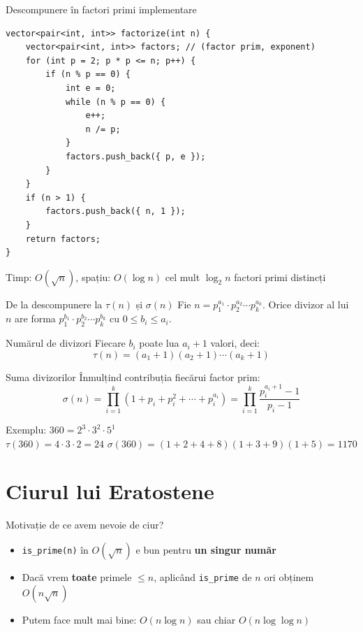\documentclass[10pt]{beamer}
\begin{document}
\begin{frame}[fragile]{Descompunere în factori primi \textemdash{} implementare}
  \begin{lstlisting}
vector<pair<int, int>> factorize(int n) {
    vector<pair<int, int>> factors; // (factor prim, exponent)
    for (int p = 2; p * p <= n; p++) {
        if (n % p == 0) {
            int e = 0;
            while (n % p == 0) {
                e++;
                n /= p;
            }
            factors.push_back({ p, e });
        }
    }
    if (n > 1) {
        factors.push_back({ n, 1 });
    }
    return factors;
}
  \end{lstlisting}
  Timp: $O(\sqrt{n})$, spațiu: $O(\log n)$ \textemdash{} cel mult $\log_2 n$ factori primi distincți
\end{frame}

\begin{frame}{De la descompunere la $\tau(n)$ și $\sigma(n)$}
  Fie $n = p_1^{a_1} \cdot p_2^{a_2} \cdots p_k^{a_k}$. Orice divizor al lui $n$ are forma
  $p_1^{b_1} \cdot p_2^{b_2} \cdots p_k^{b_k}$ cu $0 \leq b_i \leq a_i$.
  \begin{block}{Numărul de divizori}
    Fiecare $b_i$ poate lua $a_i + 1$ valori, deci:
    \[ \tau(n) = (a_1+1)(a_2+1)\cdots(a_k+1) \]
  \end{block}
  \begin{block}{Suma divizorilor}
    Înmulțind contribuția fiecărui factor prim:
    \[ \sigma(n) = \prod_{i=1}^{k}(1 + p_i + p_i^2 + \cdots + p_i^{a_i}) = \prod_{i=1}^{k}\frac{p_i^{a_i+1}-1}{p_i-1} \]
  \end{block}
  Exemplu: $360 = 2^3 \cdot 3^2 \cdot 5^1$\\
  $\tau(360) = 4 \cdot 3 \cdot 2 = 24$ \quad
  $\sigma(360) = (1{+}2{+}4{+}8)(1{+}3{+}9)(1{+}5) = 1170$
\end{frame}

\section{Ciurul lui Eratostene}

\begin{frame}{Motivație \textemdash{} de ce avem nevoie de ciur?}
  \begin{itemize}
    \item \texttt{is\_prime(n)} în $O(\sqrt{n})$ e bun pentru \textbf{un singur număr}
    \item Dacă vrem \textbf{toate} primele $\leq n$, aplicând \texttt{is\_prime} de $n$ ori obținem $O(n\sqrt{n})$
    \item Putem face mult mai bine: $O(n \log n)$ sau chiar $O(n \log \log n)$
  \end{itemize}
\end{frame}
\end{document}
